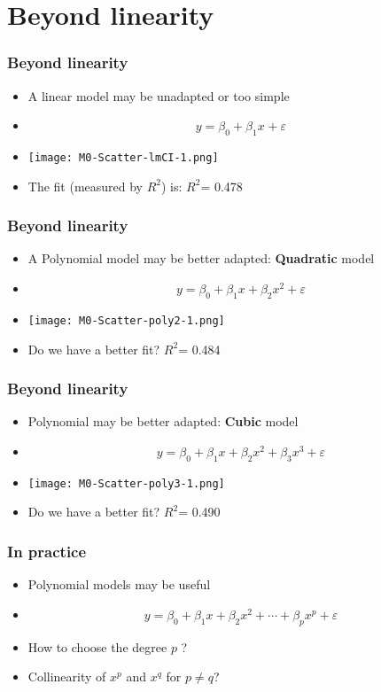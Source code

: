 \documentclass[xcolor=x11names,compress, aspectratio=169]{beamer}
\renewcommand{\(}{\begin{columns}}
\renewcommand{\)}{\end{columns}}
\newcommand{\<}[1]{\begin{column}{#1}}
\renewcommand{\>}{\end{column}}
\begin{document}




\section{Beyond linearity}
\begin{frame} %
\frametitle{Beyond linearity}
\pause
\begin{itemize}
 \item A linear model may be unadapted or too simple
 \item[]  $$y = \beta_0 + \beta_1 x^{} + \varepsilon$$
 \item[] \texttt{[image: M0-Scatter-lmCI-1.png]}
 \item[] The fit (measured by $R^2$) is: $R^2$= 0.478
 \end{itemize}
\end{frame}


\begin{frame} %
\frametitle{Beyond linearity}

\begin{itemize}
 \item A Polynomial model may be better adapted: \textbf{Quadratic} model
 \item[]  $$y = \beta_0 + \beta_1 x +  \beta_2 x^2+ \varepsilon$$
 \item[] \texttt{[image: M0-Scatter-poly2-1.png]}
 \item[] Do we have a better fit? $R^2$= 0.484
 \end{itemize}
\end{frame}

\begin{frame} %
\frametitle{Beyond linearity}

\begin{itemize}
 \item Polynomial may be better adapted: \textbf{Cubic} model
 \item[]  $$y = \beta_0 + \beta_1 x +  \beta_2 x^2 + \beta_3 x^3+ \varepsilon$$
 \item[] \texttt{[image: M0-Scatter-poly3-1.png]}
 \item[] Do we have a better fit? $R^2$= 0.490
 \end{itemize}
\end{frame}

\begin{frame} %
\frametitle{In practice}

\begin{itemize}[<+->]
 \item Polynomial models may be useful
 \item[]  $$y = \beta_0 + \beta_1 x +  \beta_2 x^2 + \cdots + \beta_p x^p + \varepsilon$$
 \item[] How to choose the degree $p$ ?
 \item[] Collinearity of $x^p$ and $x^q$ for $ p \neq q$?
 \end{itemize}
\end{frame}
\end{document}
